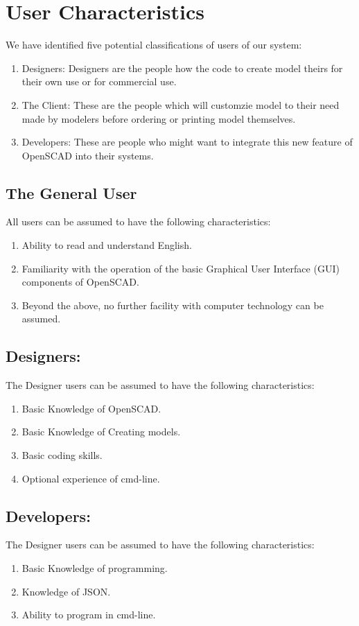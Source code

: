 \section{User Characteristics}

We have identified five potential classifications of users of our system:

\begin{enumerate}
    \item Designers: Designers are the people how the code to create model theirs for their own use or for commercial use.
    \item The Client: These are the people which will customzie model to their need made by modelers before ordering or printing model themselves.
    \item Developers: These are people who might want to integrate this new feature of OpenSCAD into their systems.
   
\end{enumerate}

\subsection{The General User}

All users can be assumed to have the following characteristics:

\begin{enumerate}
    \item Ability to read and understand English.
    \item Familiarity with the operation of the basic Graphical User Interface (GUI) components of OpenSCAD.
    \item Beyond the above, no further facility with computer technology can be assumed.
\end{enumerate}

\subsection{Designers:}
The Designer users can be assumed to have the following characteristics:
\begin{enumerate}
    \item Basic Knowledge of OpenSCAD.
    \item Basic Knowledge of Creating models.
    \item Basic coding skills.
    \item Optional experience of cmd-line.
\end{enumerate}

\subsection{Developers:}
The Designer users can be assumed to have the following characteristics:
\begin{enumerate}
    \item Basic Knowledge of programming.
    \item Knowledge of JSON.
    \item Ability to program in cmd-line.
\end{enumerate}
